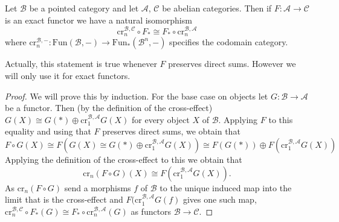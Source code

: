 \begin{lem}[label=lem:crossNatTrans]
    Let $\mathcal{B}$ be a pointed category and let $\mathcal{A}$, $\mathcal{C}$ be abelian categories. Then if $F:\mathcal{A}\rightarrow \mathcal{C}$ is an exact functor we have a natural isomorphism
    \begin{equation*}
        \text{cr}_n^{\mathcal{B},\mathcal{C}}\circ F_*\cong F_*\circ \text{cr}_n^{\mathcal{B},\mathcal{A}}
    \end{equation*}
    where $\text{cr}_n^{\mathcal{B},-}:\text{Fun}(\mathcal{B},-)\rightarrow \text{Fun}_*(\mathcal{B}^n,-)$ specifies the codomain category.
\end{lem}
Actually, this statement is true whenever $F$ preserves direct sums. However we will only use it for exact functors.
\begin{proof}
    We will prove this by induction. For the base case on objects let $G: \mathcal B \to \mathcal A$ be a functor. Then (by the definition of the cross-effect)  $G(X)\cong G(*) \oplus\text{cr}_1^{\mathcal B, \mathcal A}G(X)$ for every object $X$ of $\mathcal B$. Applying $F$ to this equality and using that $F$ preserves direct sums, we obtain that 
    $$
    F\circ G (X) \cong F(G(X)\cong G(*)\oplus  \text{cr}_1^{\mathcal B, \mathcal A}G(X)) \cong F( G(*)) \oplus F(\text{cr}_1^{\mathcal B, \mathcal A}G(X))
    $$
    Applying the definition of the cross-effect to this we obtain that
    $$\text{cr}_n(F \circ G)(X) \cong F(\text{cr}_1^{\mathcal B, \mathcal A}G(X)).$$
    As $\text{cr}_n(F \circ G)$ send a morphisms $f$ of $\mathcal B$ to the unique induced map into the limit that is the cross-effect and $F(\text{cr}_1^{\mathcal B, \mathcal A}G(f)$ gives one such map, $\text{cr}_n^{\mathcal B, \mathcal C} \circ F_*(G) \cong F_* \circ \text{cr}_n^{\mathcal B, \mathcal A}(G)$ as functors $\mathcal B \to \mathcal C$.


\end{proof}
